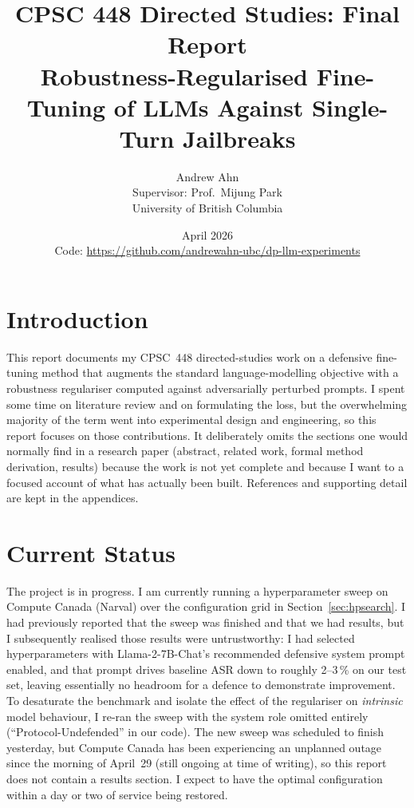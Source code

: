 \documentclass[11pt]{article}
\title{\vspace{-2.5em}\textbf{CPSC 448 Directed Studies: Final Report}\\[0.2em]
{\large Robustness-Regularised Fine-Tuning of LLMs Against Single-Turn Jailbreaks}}
\author{Andrew Ahn \\ \small Supervisor: Prof.\ Mijung Park \\ \small University of British Columbia}
\date{April 2026 \\[0.2em]
\small Code: \url{https://github.com/andrewahn-ubc/dp-llm-experiments}}
\begin{document}
\maketitle
\vspace{-1.8em}

\section{Introduction}
This report documents my CPSC~448 directed-studies work on a defensive
fine-tuning method that augments the standard language-modelling objective with
a robustness regulariser computed against adversarially perturbed prompts. I
spent some time on literature review and on formulating the loss, but the
overwhelming majority of the term went into experimental design and engineering,
so this report focuses on those contributions. It deliberately omits the
sections one would normally find in a research paper (abstract, related work,
formal method derivation, results) because the work is not yet complete and
because I want to a focused account of what has
actually been built. References and supporting detail are kept in the
appendices.

\section{Current Status}
The project is in progress. I am currently running a hyperparameter sweep on
Compute Canada (Narval) over the configuration grid in
Section~\ref{sec:hpsearch}. I had previously reported that the sweep was
finished and that we had results, but I subsequently realised those results
were untrustworthy: I had selected hyperparameters with Llama-2-7B-Chat's
recommended defensive system prompt enabled, and that prompt drives baseline
ASR down to roughly 2--3\,\% on our test set, leaving essentially no headroom
for a defence to demonstrate improvement. To desaturate the benchmark and
isolate the effect of the regulariser on \emph{intrinsic} model behaviour, I
re-ran the sweep with the system role omitted entirely (``Protocol-Undefended''
in our code). The new sweep was scheduled to finish yesterday, but Compute
Canada has been experiencing an unplanned outage since the morning of
April~29 (still ongoing at time of writing), so this report does not contain a
results section. I expect to have the optimal configuration within a day or two
of service being restored.
\end{document}
